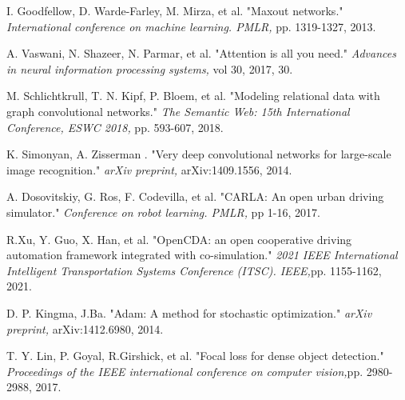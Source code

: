 \documentclass[lettersize,journal]{IEEEtran}
\begin{document}
\begin{thebibliography}{1}
I. Goodfellow, D. Warde-Farley, M. Mirza, et al. "Maxout networks." {\it{International conference on machine learning. PMLR,}} pp. 1319-1327, 2013.

A. Vaswani, N. Shazeer, N. Parmar, et al. "Attention is all you need." {\it{Advances in neural information processing systems,}} vol 30, 2017, 30.

M. Schlichtkrull, T. N. Kipf, P. Bloem, et al. "Modeling relational data with graph convolutional networks." {\it{The Semantic Web: 15th International Conference, ESWC 2018,}} pp. 593-607, 2018.

K. Simonyan, A. Zisserman . "Very deep convolutional networks for large-scale image recognition." {\it{arXiv preprint,}} arXiv:1409.1556, 2014.

A. Dosovitskiy, G. Ros, F. Codevilla, et al. "CARLA: An open urban driving simulator." {\it{Conference on robot learning. PMLR,}} pp 1-16, 2017.

R.Xu, Y. Guo, X. Han, et al. "OpenCDA: an open cooperative driving automation framework integrated with co-simulation." {\it{2021 IEEE International Intelligent Transportation Systems Conference (ITSC). IEEE,}}pp. 1155-1162, 2021.

D. P. Kingma, J.Ba. "Adam: A method for stochastic optimization." {\it{arXiv preprint,}} arXiv:1412.6980, 2014.

T. Y. Lin, P. Goyal, R.Girshick, et al. "Focal loss for dense object detection." {\it{Proceedings of the IEEE international conference on computer vision,}}pp. 2980-2988, 2017.







\end{thebibliography}







\vfill
\end{document}
